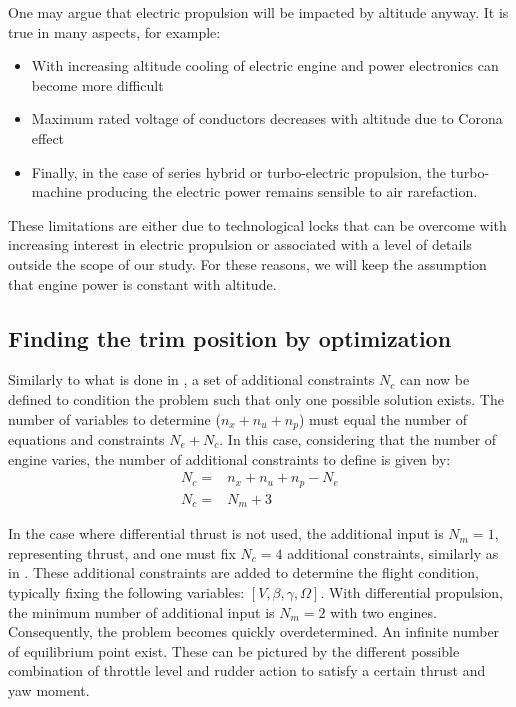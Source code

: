 One may argue that electric propulsion will be impacted by altitude anyway. It is true in many aspects, for example:
\begin{itemize}
	\item With increasing altitude cooling of electric engine and power electronics can become more difficult
	\item Maximum rated voltage of conductors decreases with altitude due to Corona effect \cite{WiringSpace}
	\item Finally, in the case of series hybrid or turbo-electric propulsion, the turbo-machine producing the electric power remains sensible to air rarefaction.
\end{itemize}

These limitations are either due to technological locks that can be overcome with increasing interest in electric propulsion or associated with a level of details outside the scope of our study. For these reasons, we will keep the assumption that engine power is constant with altitude.

\subsection{Finding the trim position by optimization}

Similarly to what is done in \cite{GomanAttainableEqui}, a set of additional constraints $N_c$ can now be defined to condition the problem such that only one possible solution exists. The number of variables to determine ($n_x+n_u+n_p$) must equal the number of equations and constraints $N_e+N_c$.
In this case, considering that the number of engine varies, the number of additional constraints to define is given by:
\begin{align}
N_c=&n_x+n_u+n_p-N_e\\
N_c=&N_m+3
\end{align}

In the case where differential thrust is not used, the additional input is $N_m=1$, representing thrust, and one must fix $N_c=4$ additional constraints, similarly as in \cite{GomanAttainableEqui}. These additional constraints are added to determine the flight condition, typically fixing the following variables: $[V,\beta,\gamma,\Omega]$. With differential propulsion, the minimum number of additional input is $N_m=2$ with two engines. Consequently, the problem becomes quickly overdetermined. An infinite number of equilibrium point exist. These can be pictured by the different possible combination of throttle level and rudder action to satisfy a certain thrust and yaw moment.

